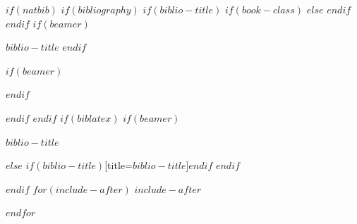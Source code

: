 \documentclass[$if(fontsize)$$fontsize$,$endif$$if(lang)$$babel-lang$,$endif$$if(papersize)$$papersize$paper,$else$a4paper,$endif$$if(beamer)$ignorenonframetext,$if(handout)$handout,$endif$$if(aspectratio)$aspectratio=$aspectratio$,$endif$$endif$$for(classoption)$$classoption$$sep$,$endfor$,tablecaptionabove]{$if(book)$scrbook$else$scrartcl$endif$}
\newif\ifbibliography
\begin{document}
$if(natbib)$
$if(bibliography)$
$if(biblio-title)$
$if(book-class)$
\renewcommand\bibname{$biblio-title$}
$else$
\renewcommand\refname{$biblio-title$}
$endif$
$endif$
$if(beamer)$
\begin{frame}[allowframebreaks]{$biblio-title$}
\bibliographytrue
$endif$

$if(beamer)$
\end{frame}
$endif$

$endif$
$endif$
$if(biblatex)$
$if(beamer)$
\begin{frame}[allowframebreaks]{$biblio-title$}
\bibliographytrue
\printbibliography[heading=none]
\end{frame}
$else$
\printbibliography$if(biblio-title)$[title=$biblio-title$]$endif$
$endif$

$endif$
$for(include-after)$
$include-after$

$endfor$
\end{document}
